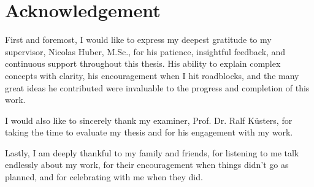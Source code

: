 \chapter*{Acknowledgement}
\label{chap:acknowledgement}

First and foremost, I would like to express my deepest gratitude to my supervisor, Nicolas Huber, M.Sc., for his patience, insightful feedback, and continuous support throughout this thesis. 
His ability to explain complex concepts with clarity, his encouragement when I hit roadblocks, and the many great ideas he contributed were invaluable to the progress and completion of this work.

I would also like to sincerely thank my examiner, Prof. Dr. Ralf Küsters, for taking the time to evaluate my thesis and for his engagement with my work.

Lastly, I am deeply thankful to my family and friends, for listening to me talk endlessly about my work, for their encouragement when things didn't go as planned, and for celebrating with me when they did.